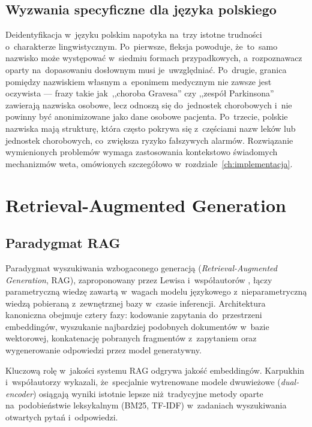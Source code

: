 \subsection{Wyzwania specyficzne dla języka polskiego}

Deidentyfikacja w~języku polskim napotyka na~trzy istotne trudności
o~charakterze lingwistycznym. Po~pierwsze, fleksja powoduje,
że~to~samo nazwisko może występować w~siedmiu formach przypadkowych,
a~rozpoznawacz oparty na~dopasowaniu dosłownym musi je~uwzględniać.
Po~drugie, granica pomiędzy nazwiskiem własnym a~eponimem medycznym
nie zawsze jest oczywista --- frazy takie jak~,,choroba Gravesa''
czy ,,zespół Parkinsona'' zawierają nazwiska osobowe, lecz odnoszą
się do~jednostek chorobowych i~nie powinny być anonimizowane jako
dane osobowe pacjenta. Po~trzecie, polskie nazwiska mają strukturę,
która często pokrywa się z~częściami nazw leków lub jednostek
chorobowych, co~zwiększa ryzyko fałszywych alarmów. Rozwiązanie
wymienionych problemów wymaga zastosowania kontekstowo świadomych
mechanizmów weta, omówionych szczegółowo w~rozdziale~\ref{ch:implementacja}.

\section{Retrieval-Augmented Generation}\label{sec:rag}

\subsection{Paradygmat RAG}

Paradygmat wyszukiwania wzbogaconego generacją (\emph{Retrieval-Augmented
Generation}, RAG), zaproponowany przez Lewisa i~współautorów
\parencite{lewis2020rag}, łączy parametryczną wiedzę zawartą w~wagach
modelu językowego z~nieparametryczną wiedzą pobieraną z~zewnętrznej
bazy w~czasie inferencji. Architektura kanoniczna obejmuje cztery
fazy: kodowanie zapytania do~przestrzeni embeddingów, wyszukanie
najbardziej podobnych dokumentów w~bazie wektorowej, konkatenację
pobranych fragmentów z~zapytaniem oraz wygenerowanie odpowiedzi
przez model generatywny.

Kluczową rolę w~jakości systemu RAG odgrywa jakość embeddingów.
Karpukhin i~współautorzy \parencite{karpukhin2020dpr} wykazali,
że~specjalnie wytrenowane modele dwuwieżowe (\emph{dual-encoder})
osiągają wyniki istotnie lepsze niż~tradycyjne metody oparte
na~podobieństwie leksykalnym (BM25, TF-IDF) w~zadaniach wyszukiwania
otwartych pytań i~odpowiedzi.

